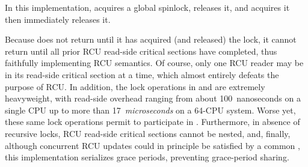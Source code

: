 In this implementation,  acquires a global
spinlock,  releases it, and
 acquires it then immediately releases it.

Because  does not return until it has acquired
(and released) the lock, it cannot return until all prior RCU read-side
critical sections have completed, thus faithfully implementing
RCU semantics.
Of course, only one RCU reader may be in its read-side critical section
at a time, which almost entirely defeats the purpose of RCU\@.
In addition, the lock operations in  and
 are extremely heavyweight,
with read-side overhead ranging from about 100~nanoseconds on a single 
CPU up to more than 17~\emph{microseconds} on a 64-CPU system.
Worse yet,
these same lock operations permit 
to participate in .
Furthermore, in absence of recursive locks,
RCU read-side critical sections cannot be nested, and, finally,
although concurrent RCU updates could in principle be satisfied by
a common , this implementation serializes grace periods,
preventing grace-period sharing.

